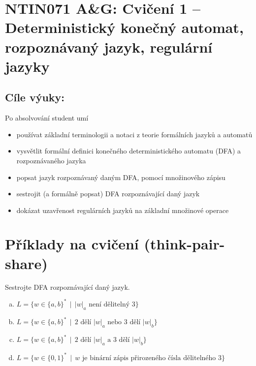 \documentclass[a4paper,12pt]{amsart}
\begin{document}
\thispagestyle{empty}

\section*{NTIN071 A\&G: Cvičení 1 -- Deterministický konečný automat, rozpoznávaný jazyk, regulární jazyky}

\medskip

\subsection*{Cíle výuky:} Po absolvování student umí

\begin{itemize}\setlength{\itemsep}{0pt}
    \item používat základní terminologii a notaci z teorie formálních jazyků a automatů
    \item vysvětlit formální definici konečného deterministického automatu (DFA) a rozpoznávaného jazyka
    \item popsat jazyk rozpoznávaný daným DFA, pomocí množinového zápisu
    \item sestrojit (a formálně popsat) DFA rozpoznávající daný jazyk
    \item dokázat uzavřenost regulárních jazyků na základní množinové operace
\end{itemize}

\section*{Příklady na cvičení (think-pair-share)}

\medskip

\medskip\begin{problem} 
    
    Sestrojte DFA rozpoznávající daný jazyk.

    \medskip
    
    \begin{enumerate}[(a)]\setlength\itemsep{6pt}        
        \item $L=\{w\in\{a,b\}^* \,\mid\, |w|_a \text{ není dělitelný 3}\}$
        \item $L=\{w\in\{a,b\}^* \,\mid\,\text{2 dělí $|w|_a$ nebo 3 dělí $|w|_b$}\}$ 
        \item $L=\{w\in\{a,b\}^* \,\mid\, \text{2 dělí $|w|_a$ a 3 dělí $|w|_b$}\}$
        \item $L=\{w\in\{0,1\}^* \,\mid\, w\text{ je binární zápis přirozeného čísla dělitelného 3}\}$        
    \end{enumerate}

\end{problem}
\end{document}
